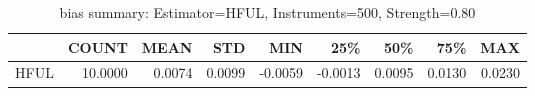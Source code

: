 \begin{table}[ht]
\centering
\caption{bias summary: Estimator=HFUL, Instruments=500, Strength=0.80}
\begin{tabular}{lrrrrrrrr}
\toprule
 & COUNT & MEAN & STD & MIN & 25\% & 50\% & 75\% & MAX \\
\midrule
HFUL & 10.0000 & 0.0074 & 0.0099 & -0.0059 & -0.0013 & 0.0095 & 0.0130 & 0.0230 \\
\bottomrule
\end{tabular}
\end{table}
